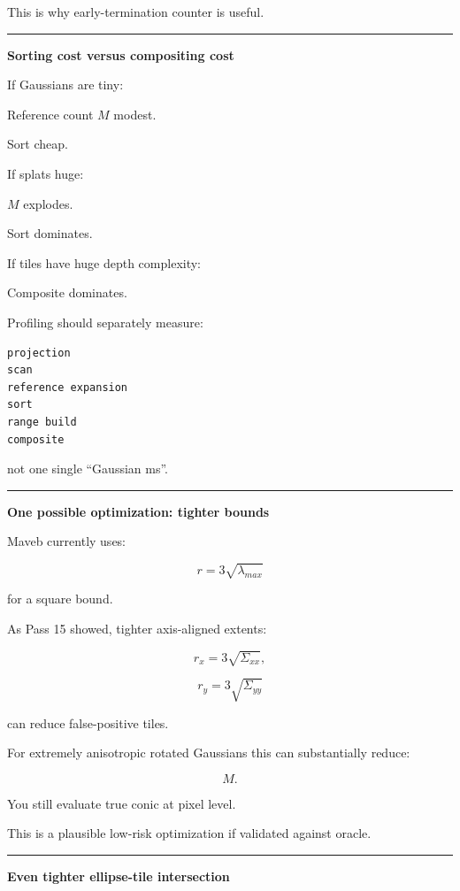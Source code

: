 This is why early-termination counter is useful.

\begin{center}\rule{0.5\linewidth}{0.5pt}\end{center}

\textbf{Sorting cost versus compositing cost}

If Gaussians are tiny:

Reference count \(M\) modest.

Sort cheap.

If splats huge:

\(M\) explodes.

Sort dominates.

If tiles have huge depth complexity:

Composite dominates.

Profiling should separately measure:

\protect{}\label{8f90ti}%
\begin{verbatim}
projection
scan
reference expansion
sort
range build
composite
\end{verbatim}

not one single ``Gaussian ms''.

\begin{center}\rule{0.5\linewidth}{0.5pt}\end{center}

\textbf{One possible optimization: tighter bounds}

Maveb currently uses:

\[
r=
3\sqrt{\lambda_{max}}
\]

for a square bound.

As Pass 15 showed, tighter axis-aligned extents:

\[
r_x=
3\sqrt{\Sigma_{xx}},
\]

\[
r_y=
3\sqrt{\Sigma_{yy}}
\]

can reduce false-positive tiles.

For extremely anisotropic rotated Gaussians this can substantially reduce:

\[
M.
\]

You still evaluate true conic at pixel level.

This is a plausible low-risk optimization if validated against oracle.

\begin{center}\rule{0.5\linewidth}{0.5pt}\end{center}

\textbf{Even tighter ellipse-tile intersection}

